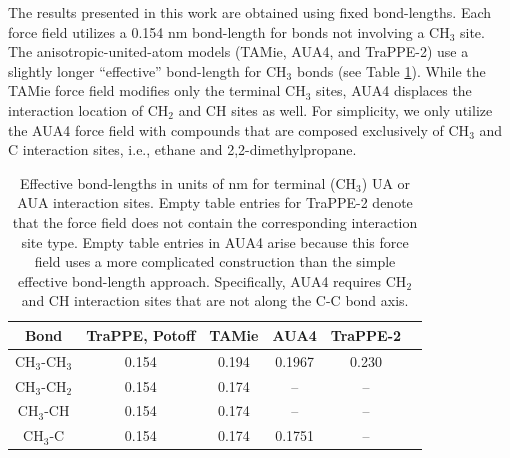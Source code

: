 \documentclass[preprint,review,12pt]{elsarticle}
\begin{document}
    
    
    The results presented in this work are obtained using fixed bond-lengths. Each force field utilizes a 0.154 nm bond-length for bonds not involving a CH$_3$ site. The anisotropic-united-atom models (TAMie, AUA4, and TraPPE-2) use a slightly longer ``effective'' bond-length for CH$_3$ bonds (see Table \ref{tab:bond-lengths}). While the TAMie force field modifies only the terminal CH$_3$ sites, AUA4 displaces the interaction location of CH$_2$ and CH sites as well. For simplicity, we only utilize the AUA4 force field with compounds that are composed exclusively of CH$_3$ and C interaction sites, i.e., ethane and 2,2-dimethylpropane.
    
    \begin{table}[h!]
    	\caption{Effective bond-lengths in units of nm for terminal (CH$_3$) UA or AUA interaction sites. Empty table entries for TraPPE-2 \cite{TraPPEUA2} denote that the force field does not contain the corresponding interaction site type. Empty table entries in AUA4 \cite{AUA4} arise because this force field uses a more complicated construction than the simple effective bond-length approach. Specifically, AUA4 requires CH$_2$ and CH interaction sites that are not along the C-C bond axis.} \label{tab:bond-lengths}
    	\begin{center}
    		\begin{tabular}{|c|c|c|c|c|c|}
    			\hline
    			Bond & TraPPE, Potoff & TAMie & AUA4 & TraPPE-2 \\ \hline
    			CH$_3$-CH$_3$ & 0.154 & 0.194 & 0.1967 & 0.230 \\ 
    			CH$_3$-CH$_2$ & 0.154 & 0.174 & -- & -- \\ 
    			CH$_3$-CH & 0.154 & 0.174 & -- & -- \\
    			CH$_3$-C & 0.154 & 0.174 & 0.1751 & -- \\
    			\hline
    		\end{tabular}
    	\end{center} 
    \end{table}
    
\end{document}
